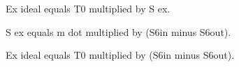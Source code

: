 Ex ideal equals T0 multiplied by S ex.  

S ex equals m dot multiplied by (S6in minus S6out).  

Ex ideal equals T0 multiplied by (S6in minus S6out).